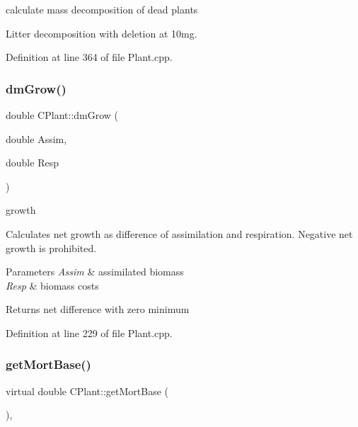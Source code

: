 calculate mass decomposition of dead plants 

Litter decomposition with deletion at 10mg. 

Definition at line 364 of file Plant.\+cpp.

\mbox{\label{class_c_plant_af0b2cca25cc5a0a623d344a2c48ac73a}} 
\subsubsection{\texorpdfstring{dmGrow()}{dmGrow()}}
{\footnotesize\ttfamily double C\+Plant\+::dm\+Grow (\begin{DoxyParamCaption}\item[{double}]{Assim,  }\item[{double}]{Resp }\end{DoxyParamCaption})\hspace{0.3cm}{\ttfamily [virtual]}}



growth 

Calculates net growth as difference of assimilation and respiration. Negative net growth is prohibited.


\begin{DoxyParams}{Parameters}
{\em Assim} & assimilated biomass \\
\hline
{\em Resp} & biomass costs \\
\hline
\end{DoxyParams}
\begin{DoxyReturn}{Returns}
net difference with zero minimum 
\end{DoxyReturn}


Definition at line 229 of file Plant.\+cpp.

\mbox{\label{class_c_plant_a045f39f51bcafabb15d0e16bdd58b017}} 
\subsubsection{\texorpdfstring{getMortBase()}{getMortBase()}}
{\footnotesize\ttfamily virtual double C\+Plant\+::get\+Mort\+Base (\begin{DoxyParamCaption}{ }\end{DoxyParamCaption})\hspace{0.3cm}{\ttfamily [inline]}, {\ttfamily [virtual]}}

